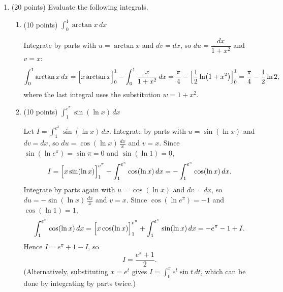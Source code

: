 \documentclass[12pt,letterpaper]{article}
\newcommand{\points}[1]{(#1 points)}
\begin{document}
\begin{enumerate}[label=\textbf{\arabic*.},leftmargin=2em]
\begin{enumerate}[label=(\alph*)]
        \begin{solution}
          The point of tangency is $\bigl(4,f^{-1}(4)\bigr)=(4,1)$ and the
          slope is $\tfrac1{12}$, so the tangent line is
          \[
            y=1+\frac{1}{12}(x-4),\quad\text{that is,}\quad
            y=\frac{x}{12}+\frac23.
          \]
        \end{solution}
        \vfill
    \end{enumerate}
    \newpage

  \item \points{20}
    Evaluate the following integrals.
    \begin{enumerate}[label=(\alph*)]
      \item \points{10}\quad
        $\displaystyle\int_0^1\arctan x\,dx$

        \begin{solution}
          Integrate by parts with $u=\arctan x$ and $dv=dx$, so
          $du=\dfrac{dx}{1+x^2}$ and $v=x$:
          \[
            \int_0^1\arctan x\,dx
            =\Bigl[x\arctan x\Bigr]_0^1-\int_0^1\frac{x}{1+x^2}\,dx
            =\frac\pi4-\Bigl[\frac12\ln\bigl(1+x^2\bigr)\Bigr]_0^1
            =\frac\pi4-\frac12\ln 2,
          \]
          where the last integral uses the substitution $w=1+x^2$.
        \end{solution}
        \vfill

      \item \points{10}\quad
        $\displaystyle\int_1^{e^{\pi}}\sin(\ln x)\,dx$

        \begin{solution}
          Let $I=\int_1^{e^\pi}\sin(\ln x)\,dx$. Integrate by parts with
          $u=\sin(\ln x)$ and $dv=dx$, so $du=\cos(\ln x)\,\frac{dx}{x}$ and
          $v=x$. Since $\sin(\ln e^\pi)=\sin\pi=0$ and $\sin(\ln 1)=0$,
          \[
            I=\Bigl[x\sin(\ln x)\Bigr]_1^{e^\pi}-\int_1^{e^\pi}\cos(\ln x)\,dx
             =-\int_1^{e^\pi}\cos(\ln x)\,dx.
          \]
          Integrate by parts again with $u=\cos(\ln x)$ and $dv=dx$, so
          $du=-\sin(\ln x)\,\frac{dx}{x}$ and $v=x$. Since
          $\cos(\ln e^\pi)=-1$ and $\cos(\ln1)=1$,
          \[
            \int_1^{e^\pi}\cos(\ln x)\,dx
            =\Bigl[x\cos(\ln x)\Bigr]_1^{e^\pi}+\int_1^{e^\pi}\sin(\ln x)\,dx
            =-e^\pi-1+I.
          \]
          Hence $I=e^\pi+1-I$, so
          \[
            I=\frac{e^\pi+1}{2}.
          \]
          (Alternatively, substituting $x=e^t$ gives
          $I=\int_0^\pi e^t\sin t\,dt$, which can be done by integrating by
          parts twice.)
        \end{solution}
        \vfill
    \end{enumerate}
    \newpage


\end{enumerate}
\end{document}
